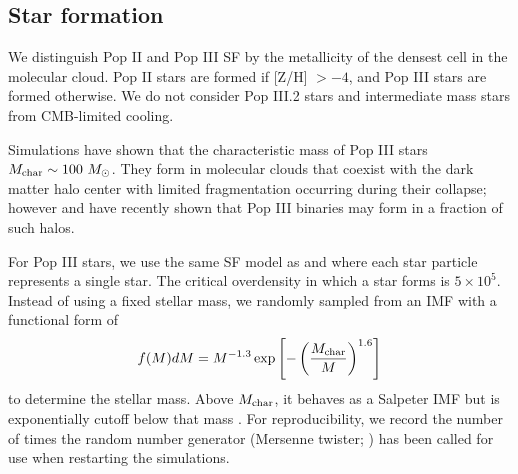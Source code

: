 \documentclass[12pt]{article}
\newcommand{\Ms}{\ifmmode{M_\odot}\else{$M_\odot$}\fi}
\begin{document}

\subsection*{Star formation}

We distinguish Pop II and Pop III SF by the metallicity of the densest
cell in the molecular cloud.  Pop II stars are formed if [Z/H] $> -4$,
and Pop III stars are formed otherwise.  We do not consider Pop III.2
stars and intermediate mass stars from CMB-limited cooling.

Simulations have shown that the characteristic mass of Pop III stars
$M_{\rm char} \sim 100~\Ms$.  They form in molecular clouds that
coexist with the dark matter halo center with limited fragmentation
occurring during their collapse; however \cite{2009Sci...325..601T}
and \cite{Stacy10_Binary} have recently shown that Pop III binaries
may form in a fraction of such halos.


For Pop III stars, we use the same SF model as \cite{Abel07} and
\cite{Wise08_Gal} where each star particle represents a single star.
The critical overdensity in which a star forms is $5 \times 10^5$.
Instead of using a fixed stellar mass, we randomly sampled from an IMF
with a functional form of
%
\begin{equation}
\label{eqn:imf}
f(M)dM = M^{-1.3} \exp\left[-\left(\frac{M_{\rm char}}{M}\right)^{1.6}\right]
\end{equation}
to determine the stellar mass.  Above $M_{\rm char}$, it behaves as a
Salpeter IMF but is exponentially cutoff below that mass
\cite{Chabrier03, Clark09}.  For reproducibility, we record the
number of times the random number generator (Mersenne twister; \cite{MTwister})
has been called for use when restarting the simulations.
\end{document}
